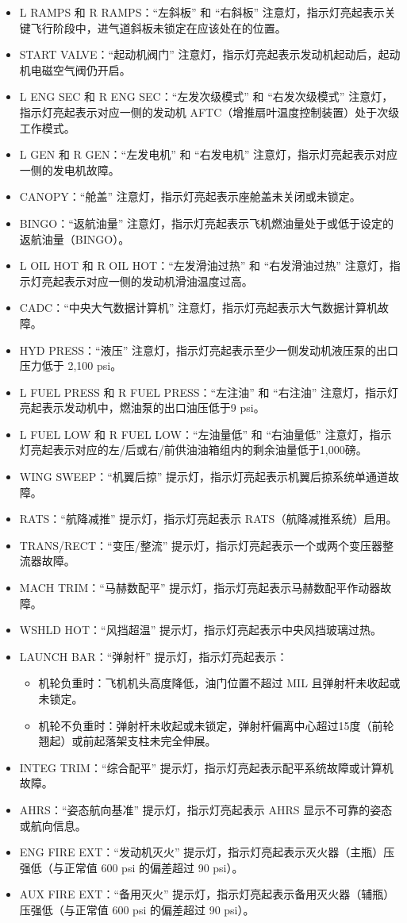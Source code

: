 \begin{itemize}
  \item L RAMPS 和 R RAMPS：“左斜板” 和 “右斜板” 注意灯，指示灯亮起表示关键飞行阶段中，进气道斜板未锁定在应该处在的位置。
  \item START VALVE：“起动机阀门” 注意灯，指示灯亮起表示发动机起动后，起动机电磁空气阀仍开启。
  \item L ENG SEC 和 R ENG SEC：“左发次级模式” 和 “右发次级模式” 注意灯，指示灯亮起表示对应一侧的发动机 AFTC（增推扇叶温度控制装置）处于次级工作模式。
  \item L GEN 和 R GEN：“左发电机” 和 “右发电机” 注意灯，指示灯亮起表示对应一侧的发电机故障。
  \item CANOPY：“舱盖” 注意灯，指示灯亮起表示座舱盖未关闭或未锁定。
  \item BINGO：“返航油量” 注意灯，指示灯亮起表示飞机燃油量处于或低于设定的返航油量（BINGO）。
  \item L OIL HOT 和 R OIL HOT：“左发滑油过热” 和 “右发滑油过热” 注意灯，指示灯亮起表示对应一侧的发动机滑油温度过高。
  \item CADC：“中央大气数据计算机” 注意灯，指示灯亮起表示大气数据计算机故障。
  \item HYD PRESS：“液压” 注意灯，指示灯亮起表示至少一侧发动机液压泵的出口压力低于 2,100 psi。
  \item L FUEL PRESS 和 R FUEL PRESS：“左注油” 和 “右注油” 注意灯，指示灯亮起表示发动机中，燃油泵的出口油压低于9 psi。
  \item L FUEL LOW 和 R FUEL LOW：“左油量低” 和 “右油量低” 注意灯，指示灯亮起表示对应的左/后或右/前供油油箱组内的剩余油量低于1,000磅。
  \item WING SWEEP：“机翼后掠” 提示灯，指示灯亮起表示机翼后掠系统单通道故障。
  \item RATS：“航降减推” 提示灯，指示灯亮起表示 RATS（航降减推系统）启用。
  \item TRANS/RECT：“变压/整流” 提示灯，指示灯亮起表示一个或两个变压器整流器故障。
  \item MACH TRIM：“马赫数配平” 提示灯，指示灯亮起表示马赫数配平作动器故障。
  \item WSHLD HOT：“风挡超温” 提示灯，指示灯亮起表示中央风挡玻璃过热。
  \item LAUNCH BAR：“弹射杆” 提示灯，指示灯亮起表示：
  \begin{itemize}
    \item 机轮负重时：飞机机头高度降低，油门位置不超过 MIL 且弹射杆未收起或未锁定。
    \item 机轮不负重时：弹射杆未收起或未锁定，弹射杆偏离中心超过15度（前轮翘起）或前起落架支柱未完全伸展。
  \end{itemize}
  \item INTEG TRIM：“综合配平” 提示灯，指示灯亮起表示配平系统故障或计算机故障。
  \item AHRS：“姿态航向基准” 提示灯，指示灯亮起表示 AHRS 显示不可靠的姿态或航向信息。
  \item ENG FIRE EXT：“发动机灭火” 提示灯，指示灯亮起表示灭火器（主瓶）压强低（与正常值 600 psi 的偏差超过 90 psi）。
  \item AUX FIRE EXT：“备用灭火” 提示灯，指示灯亮起表示备用灭火器（辅瓶）压强低（与正常值 600 psi 的偏差超过 90 psi）。
\end{itemize}

